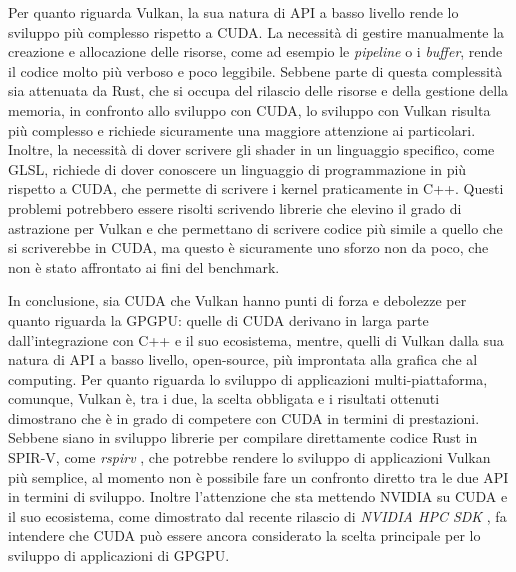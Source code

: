 Per quanto riguarda Vulkan, la sua natura di \gls{API} a basso livello rende lo sviluppo più complesso rispetto a \gls{CUDA}. La necessità di gestire manualmente la creazione e allocazione delle risorse, come ad esempio le \textit{pipeline} o i \textit{buffer}, rende il codice molto più verboso e poco leggibile. Sebbene parte di questa complessità sia attenuata da Rust, che si occupa del rilascio delle risorse e della gestione della memoria, in confronto allo sviluppo con \gls{CUDA}, lo sviluppo con Vulkan risulta più complesso e richiede sicuramente una maggiore attenzione ai particolari. Inoltre, la necessità di dover scrivere gli shader in un linguaggio specifico, come \gls{GLSL}, richiede di dover conoscere un linguaggio di programmazione in più rispetto a \gls{CUDA}, che permette di scrivere i kernel praticamente in C++.
Questi problemi potrebbero essere risolti scrivendo librerie che elevino il grado di astrazione per Vulkan e che permettano di scrivere codice più simile a quello che si scriverebbe in \gls{CUDA}, ma questo è sicuramente uno sforzo non da poco, che non è stato affrontato ai fini del benchmark.


In conclusione, sia \gls{CUDA} che Vulkan hanno punti di forza e debolezze per quanto riguarda la \gls{GPGPU}: quelle di \gls{CUDA} derivano in larga parte dall'integrazione con C++ e il suo ecosistema, mentre, quelli di Vulkan dalla sua natura di \gls{API} a basso livello, open-source, più improntata alla grafica che al computing. Per quanto riguarda lo sviluppo di applicazioni multi-piattaforma, comunque, Vulkan è, tra i due, la scelta obbligata e i risultati ottenuti dimostrano che è in grado di competere con \gls{CUDA} in termini di prestazioni. Sebbene siano in sviluppo librerie per compilare direttamente codice Rust in \gls{SPIR-V}, come \textit{rspirv} \cite[]{KG:rspirv}, che potrebbe rendere lo sviluppo di applicazioni Vulkan più semplice, al momento non è possibile fare un confronto diretto tra le due \gls{API} in termini di sviluppo. Inoltre l'attenzione che sta mettendo NVIDIA su \gls{CUDA} e il suo ecosistema, come dimostrato dal recente rilascio di \textit{NVIDIA HPC SDK} \cite[]{NVIDIA:hpc_sdk}, fa intendere che \gls{CUDA} può essere ancora considerato la scelta principale per lo sviluppo di applicazioni di \gls{GPGPU}.

